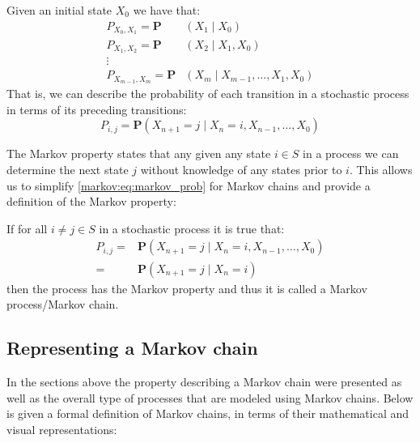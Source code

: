 Given an initial state $X_0$ we have that:
\begin{align*}
P_{X_0,X_1} = \mathbf{P}&(X_1 \mid X_0)\\
P_{X_1,X_2} = \mathbf{P}&(X_2 \mid X_1, X_0)\\
\vdots\\
P_{X_{m-1},X_m} = \mathbf{P}&(X_m \mid X_{m-1}, \dots, X_1, X_0)
\end{align*}
That is, we can describe the probability of each transition in a stochastic process in terms of its preceding transitions:
\begin{equation}\label{markov:eq:stochastic_prob}
P_{i,j} = \mathbf{P}(X_{n+1} = j \mid X_n = i, X_{n-1}, \dots, X_0)
\end{equation}

The Markov property states that any given any state $i \in S$ in a process we can determine the next state $j$ without knowledge of any states prior to $i$.
This allows us to simplify \cref{markov:eq:markov_prob} for Markov chains and provide a definition of the Markov property:

If for all $i \neq j \in S$ in a stochastic process it is true that:
\begin{align}\label{markov:eq:markov_prob}
P_{i,j} = &\mathbf{P}(X_{n+1} = j \mid X_n = i, X_{n-1}, \dots, X_0) \nonumber\\
        = &\mathbf{P}(X_{n+1} = j \mid X_n = i)
\end{align}
then the process has the Markov property and thus it is called a Markov process/Markov chain.

\subsection{Representing a Markov chain}
In the sections above the property describing a Markov chain were presented as well as the overall type of processes that are modeled using Markov chains.
Below is given a formal definition of Markov chains, in terms of their mathematical and visual representations:

